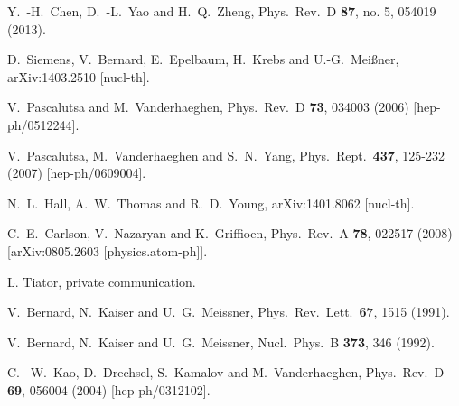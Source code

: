 \documentclass[prc,twocolumn,showpacs,preprintnumbers,amsmath,amssymb
,superscriptaddress,a4paper,nofootinbib
]{revtex4-1}
\begin{document}
\begin{thebibliography}{99}
  
  Y.~-H.~Chen, D.~-L.~Yao and H.~Q.~Zheng,
  Phys.\ Rev.\ D {\bf 87}, no. 5, 054019 (2013).

  D.~Siemens, V.~Bernard, E.~Epelbaum, H.~Krebs and U.-G.~Mei\ss ner,
  arXiv:1403.2510 [nucl-th].


  
  
  V.~Pascalutsa and M.~Vanderhaeghen,
  Phys.\ Rev.\ D {\bf 73}, 034003 (2006)
  [hep-ph/0512244].
  
  
  V.~Pascalutsa, M.~Vanderhaeghen and S.~N.~Yang,
   Phys.\ Rept.\ {\bf 437}, 125-232 (2007)
   [hep-ph/0609004].
  
  N.~L.~Hall, A.~W.~Thomas and R.~D.~Young,
  arXiv:1401.8062 [nucl-th].
  
  C.~E.~Carlson, V.~Nazaryan and K.~Griffioen,
  Phys.\ Rev.\ A {\bf 78}, 022517 (2008)
  [arXiv:0805.2603 [physics.atom-ph]].

L. Tiator, private communication.

  V.~Bernard, N.~Kaiser and U.~G.~Meissner,
  Phys.\ Rev.\ Lett.\  {\bf 67}, 1515 (1991).

  V.~Bernard, N.~Kaiser and U.~G.~Meissner,
  Nucl.\ Phys.\ B {\bf 373}, 346 (1992).
  
  C.~-W.~Kao, D.~Drechsel, S.~Kamalov and M.~Vanderhaeghen,
  Phys.\ Rev.\ D {\bf 69}, 056004 (2004)
  [hep-ph/0312102].


\end{thebibliography}
\end{document}
